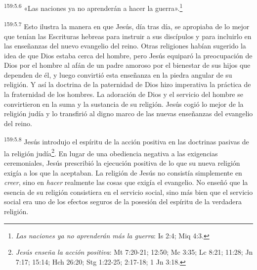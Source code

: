 \par 
\textsuperscript{159:5.6} «Las naciones ya no aprenderán a hacer la guerra».\footnote{\textit{Las naciones ya no aprenderán más la guerra}: Is 2:4; Miq 4:3.}

\par 
\textsuperscript{159:5.7} Esto ilustra la manera en que Jesús, día tras día, se apropiaba de lo mejor que tenían las Escrituras hebreas para instruir a sus discípulos y para incluirlo en las enseñanzas del nuevo evangelio del reino. Otras religiones habían sugerido la idea de que Dios estaba cerca del hombre, pero Jesús equiparó la preocupación de Dios por el hombre al afán de un padre amoroso por el bienestar de sus hijos que dependen de él, y luego convirtió esta enseñanza en la piedra angular de su religión. Y así la doctrina de la paternidad de Dios hizo imperativa la práctica de la fraternidad de los hombres. La adoración de Dios y el servicio del hombre se convirtieron en la suma y la sustancia de su religión. Jesús cogió lo mejor de la religión judía y lo transfirió al digno marco de las nuevas enseñanzas del evangelio del reino.

\par 
\textsuperscript{159:5.8} Jesús introdujo el espíritu de la acción positiva en las doctrinas pasivas de la religión judía\footnote{\textit{Jesús enseña la acción positiva}: Mt 7:20-21; 12:50; Mc 3:35; Lc 8:21; 11:28; Jn 7:17; 15:14; Hch 26:20; Stg 1:22-25; 2:17-18; 1 Jn 3:18.}. En lugar de una obediencia negativa a las exigencias ceremoniales, Jesús prescribió la ejecución positiva de lo que su nueva religión exigía a los que la aceptaban. La religión de Jesús no consistía simplemente en \textit{creer}, sino en \textit{hacer} realmente las cosas que exigía el evangelio. No enseñó que la esencia de su religión consistiera en el servicio social, sino más bien que el servicio social era uno de los efectos seguros de la posesión del espíritu de la verdadera religión.

